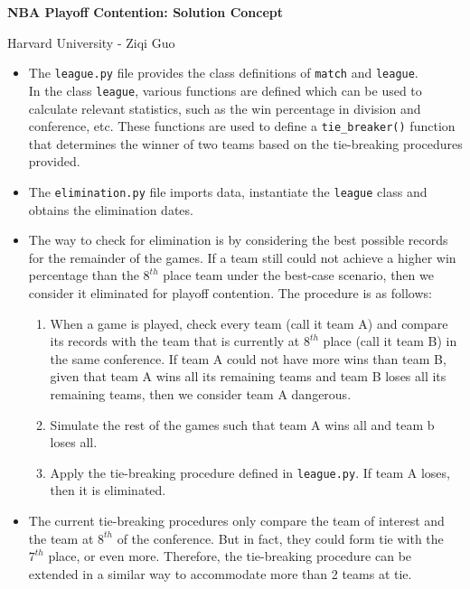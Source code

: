 \documentclass[12pt]{article}
\begin{document}
\begin{center}
\large\bf NBA Playoff Contention: Solution Concept
\end{center}
\begin{center}
\large
Harvard University - Ziqi Guo
\end{center}
\begin{itemize}
\item The \texttt{league.py} file provides the class definitions of \texttt{match} and \texttt{league}. 
\medskip\\In the class \texttt{league}, various functions are defined which can be used to calculate relevant statistics, such as the win percentage in division and conference, etc. These functions are used to define a \texttt{tie\_breaker()} function that determines the winner of two teams based on the tie-breaking procedures provided.
\item The \texttt{elimination.py} file imports data, instantiate the \texttt{league} class and obtains the elimination dates.
\item The way to check for elimination is by considering the best possible records for the remainder of the games. If a team still could not achieve a higher win percentage than the $8^{th}$ place team under the best-case scenario, then we consider it eliminated for playoff contention. The procedure is as follows: 
\begin{enumerate}
\item{} When a game is played, check every team (call it team A) and compare its records with the team that is currently at $8^{th}$ place (call it team B) in the same conference. If team A could not have more wins than team B, given that team A wins all its remaining teams and team B loses all its remaining teams, then we consider team A dangerous.
\item{} Simulate the rest of the games such that team A wins all and team b loses all.
\item{} Apply the tie-breaking procedure defined in \texttt{league.py}. If team A loses, then it is eliminated.
\end{enumerate}
\item The current tie-breaking procedures only compare the team of interest and the team at $8^{th}$ of the conference. But in fact, they could form tie with the $7^{th}$ place, or even more. Therefore, the tie-breaking procedure can be extended in a similar way to accommodate more than 2 teams at tie.
\end{itemize}
\end{document}
